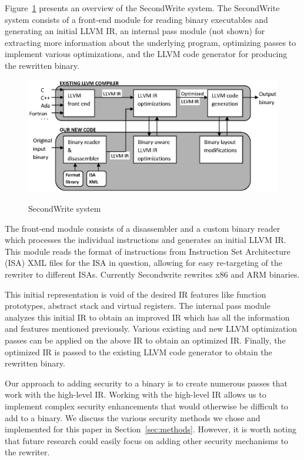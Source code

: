 Figure~\ref{swoverview} presents an overview of the SecondWrite
system. The SecondWrite system consists of a front-end module for
reading binary executables and generating an initial LLVM IR, an
internal pass module (not shown) for extracting more information about
the underlying program, optimizing passes to implement various
optimizations, and the LLVM code generator for producing the rewritten
binary.

\begin{figure}
\begin{center}
\includegraphics[scale=0.65]{images/flow.eps}
\end{center}
\renewcommand{\baselinestretch}{1}
\small\normalsize
\begin{quote}
\vspace{-0.2in}
\caption{SecondWrite system}
\label{swoverview}
\vspace{-0.5in}
\end{quote}
\end{figure}
\renewcommand{\baselinestretch}{2}

The front-end module consists of a disassembler and a custom binary
reader which processes the individual instructions and generates an
initial LLVM IR. This module reads the format of instructions from
Instruction Set Architecture (ISA) XML files for the ISA in question,
allowing for easy re-targeting of the rewriter to different
ISAs. Currently Secondwrite rewrites x86 and ARM binaries.

This initial representation is void of the desired IR features like
function prototypes, abstract stack and virtual registers. The
internal pass module analyzes this initial IR to obtain an improved IR
which has all the information and features mentioned
previously. Various existing and new LLVM optimization passes can be
applied on the above IR to obtain an optimized IR. Finally, the
optimized IR is passed to the existing LLVM code generator to obtain
the rewritten binary.

 Our approach to adding security to a binary is
to create numerous passes that work with the high-level IR. Working
with the high-level IR allows us to implement complex security
enhancements that would otherwise be difficult to add to a binary. We
discuss the various security methods we chose and implemented for this
paper in Section~\ref{sec:methods}. However, it is worth noting that
future research could easily focus on adding other security mechanisms
to the rewriter.

